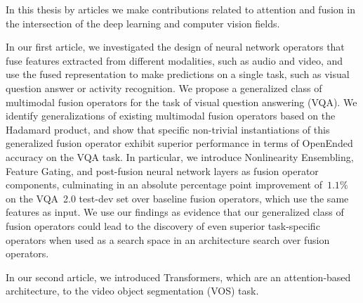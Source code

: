 In this thesis by articles we make contributions related to attention and
fusion in the intersection of the deep learning and computer vision fields.

In our first article, we investigated the design of neural network operators
that fuse features extracted from different modalities, such as audio and
video, and use the fused representation to make predictions on a single task,
such as visual question answer or activity recognition.
We propose a generalized class of multimodal fusion operators for the task of
visual question answering (VQA).
We identify generalizations of existing multimodal fusion operators based on
the Hadamard product, and show that specific non-trivial instantiations of this
generalized fusion operator exhibit superior performance in terms of OpenEnded
accuracy on the VQA task.
In particular, we introduce Nonlinearity Ensembling, Feature Gating, and
post-fusion neural network layers as fusion operator components, culminating in
an absolute percentage point improvement of~$1.1\%$ on the VQA~2.0 test-dev set
over baseline fusion operators, which use the same features as input.
We use our findings as evidence that our generalized class of fusion operators
could lead to the discovery of even superior task-specific operators when used
as a search space in an architecture search over fusion operators.

In our second article, we introduced Transformers, which are an attention-based
architecture, to the video object segmentation (VOS) task.
